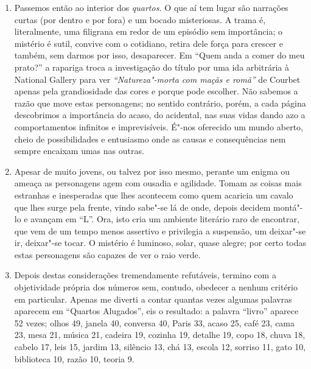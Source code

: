 \begin{enumerate}
\item Passemos então ao interior dos \emph{quartos. }O que aí tem lugar
são narrações curtas (por dentro e por fora) e um bocado misteriosas. A
trama é, literalmente, uma filigrana em redor de um episódio sem
importância; o mistério é sutil, convive com o cotidiano, retira dele
força para crescer e também, sem darmos por isso, desaparecer. Em
``Quem anda a comer do meu prato?'' a rapariga troca a investigação do
título por uma ida arbitrária à National Gallery para ver
\emph{``Natureza"-morta com maçãs e romã''} de Courbet apenas pela grandiosidade
das cores e porque pode escolher. Não sabemos a razão que move estas
personagens; no sentido contrário, porém, a cada página descobrimos a
importância do acaso, do acidental, nas suas vidas dando azo a
comportamentos infinitos e imprevisíveis. É"-nos oferecido um mundo
aberto, cheio de possibilidades e entusiasmo onde as causas e
consequências nem sempre encaixam umas nas outras.

\item Apesar de muito jovens, ou talvez por isso mesmo, perante um enigma ou
ameaça as personagens agem com ousadia e agilidade. Tomam as coisas mais
estranhas e inesperadas que lhes acontecem como quem acaricia um cavalo que lhes surge
pela frente, vindo sabe"-se lá de onde, depois decidem montá"-lo e avançam
em ``L''. Ora, isto cria um ambiente literário raro de encontrar, que
vem de um tempo menos assertivo e privilegia a suspensão, um deixar"-se
ir, deixar"-se tocar. O mistério é luminoso, solar, quase alegre; por
certo todas estas personagens são capazes de ver o raio verde.

\item Depois destas considerações tremendamente refutáveis, termino com a
objetividade própria dos números sem, contudo, obedecer a nenhum
critério em particular. Apenas me diverti a contar quantas vezes algumas
palavras aparecem em ``Quartos Alugados'', eis o resultado: a palavra
``livro'' aparece 52 vezes; olhos 49, janela 40, conversa 40, Paris 33,
acaso 25, café 23, cama 23, mesa 21, música 21, cadeira 19,
cozinha 19, detalhe 19, copo 18, chuva 18, cabelo 17, leis 15,
jardim 13, silêncio 13, chá 13, escola 12, sorriso 11, gato 10,
biblioteca 10, razão 10, teoria 9.
\end{enumerate}

\chapter*{}

